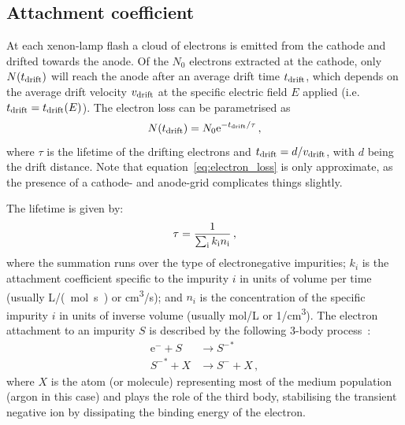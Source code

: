 \documentclass[a4paper,11pt]{article}
\providecommand*{\eu}%
{\ensuremath{\mathrm{e}}}
\begin{document}
\subsection{Attachment coefficient}
\label{subsec:attachment}
At each xenon-lamp flash a cloud of electrons is emitted from the cathode and drifted towards the anode. Of the $N_0$ electrons extracted at the cathode, only $N(t_{\rm drift})$ will reach the anode after an average drift time $t_{\rm drift}$, which depends on the average drift velocity $v_{\rm drift}$ at the specific electric field $E$ applied (i.e. $t_{\rm drift} = t_{\rm drift}(E)$). The electron loss can be parametrised as
\begin{equation}
    N(t_{\rm drift}) = N_0 \eu^{-t_{\rm drift}/\tau} \,,
    \label{eq:electron_loss}
\end{equation}
\noindent where $\tau$ is the lifetime of the drifting electrons and $t_{\rm drift} = d/v_{\rm drift}$, with $d$ being the drift distance. Note that equation~\ref{eq:electron_loss} is only approximate, as the presence of a cathode- and anode-grid complicates things slightly.

The lifetime is given by: 
\begin{equation}
    \tau = \frac{1}{\sum_{\rm i} k_{\rm i} n_{\rm i}} \, ,
    \label{eq:attachement}
\end{equation}
\noindent where the summation runs over the type of electronegative impurities; $k_i$ is the attachment coefficient specific to the impurity $i$ in units of volume per time (usually \si{\liter /(mol.s)} or \si{cm^3/s}); and $n_i$ is the concentration of the specific impurity $i$ in units of inverse volume (usually \si{mol/\liter} or \si{1/cm^3}).  
The electron attachment to an impurity $S$ is described by the following 3-body process~\cite{EmissionDetectorsBook}:
\begin{equation}
    \begin{aligned}
    \eu^- + S      & \rightarrow {S^-}^* \\
    {S^-}^* + X & \rightarrow S^- + X \,,
    \end{aligned}
    \label{eq:Block-Broadbury}
\end{equation}
\noindent where $X$ is the atom (or molecule) representing most of the medium population (argon in this case) and plays the role of the third body, stabilising the transient negative ion by dissipating the binding energy of the electron. 
\end{document}

